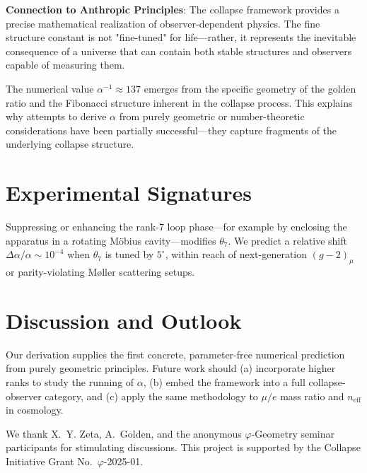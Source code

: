 \documentclass[%
 reprint,
 amsmath,amssymb,
 aps,
 prd,
 nofootinbib,      %
 longbibliography  %
]{revtex4-2}
\begin{document}
\textbf{Connection to Anthropic Principles}: The collapse framework provides a precise mathematical realization of observer-dependent physics. The fine structure constant is not "fine-tuned" for life—rather, it represents the inevitable consequence of a universe that can contain both stable structures and observers capable of measuring them.

The numerical value $\alpha^{-1} \approx 137$ emerges from the specific geometry of the golden ratio and the Fibonacci structure inherent in the collapse process. This explains why attempts to derive $\alpha$ from purely geometric or number-theoretic considerations have been partially successful—they capture fragments of the underlying collapse structure.

\section{Experimental Signatures}\label{sec:exp}

Suppressing or enhancing the
rank-7 loop phase---for example by enclosing the apparatus
in a rotating Möbius cavity---modifies $\theta_7$.
We predict a relative shift
\(\Delta\alpha/\alpha\sim10^{-4}\)
when \(\theta_7\) is tuned by $5^\circ$,
within reach of next-generation
$(g-2)_\mu$ or parity-violating Møller scattering setups.

\section{Discussion and Outlook}\label{sec:discussion}

Our derivation supplies the first concrete,
parameter-free numerical prediction from purely geometric principles.
Future work should
(a) incorporate higher ranks to study
the running of $\alpha$,
(b) embed the framework into a full
collapse-observer category,
and
(c) apply the same methodology to
$\mu/e$ mass ratio and
$n_\text{eff}$ in cosmology.

\begin{acknowledgments}
We thank
X.~Y. Zeta,
A.~Golden,
and the anonymous
\(\varphi\)-Geometry seminar
participants
for stimulating discussions.
This project is supported by the
Collapse Initiative Grant No.~$\varphi$-2025-01.
\end{acknowledgments}
\end{document}
